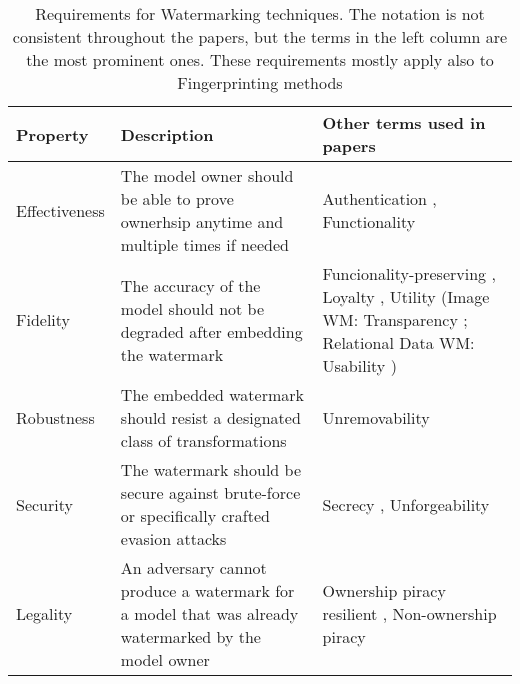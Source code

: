 \begin{table*}[t]
\centering
\caption{Requirements for Watermarking techniques. The notation is not consistent throughout the papers, but the terms in the left column are the most prominent ones. These requirements mostly apply also to Fingerprinting methods}


\begin{tabular}{|p{}|p{}|p{}|}
\rowcolor{gray!15}
\hline
\textbf{Property}               & \textbf{Description}                                                                                              & \textbf{Other terms used in papers}                        \\ \hline
%
Effectiveness                   & The model owner should be able to prove ownerhsip anytime and multiple times if needed                            & Authentication \cite{li_piracy_2020}, Functionality \cite{li_how_2019}                              \\ \hline
%
Fidelity                        & The accuracy of the model should not be degraded after embedding the watermark                                    & Funcionality-preserving \cite{li_piracy_2020, wang_robust_2020, adi_turning_2018}, Loyalty \cite{merrer_adversarial_2019}, Utility \cite{szyller_dawn_2020}
\scriptsize{(Image WM: Transparency \cite{potdar_survey_2005}; Relational Data WM: Usability \cite{kamran_comprehensive_2018})}                \\ \hline
%
Robustness                      & The embedded watermark should resist a designated class of transformations                                        & Unremovability \cite{adi_turning_2018, szyller_dawn_2020}                                            \\ \hline
%
Security                        & The watermark should be secure against brute-force or specifically crafted evasion attacks                        & Secrecy \cite{skripniuk_black-box_2020}, Unforgeability \cite{adi_turning_2018, wang_robust_2020}                                    \\ \hline
%
Legality                        & An adversary cannot produce a watermark for a model that was already watermarked by the model owner               & Ownership piracy resilient \cite{adi_turning_2018, wang_robust_2020}, Non-ownership piracy \cite{szyller_dawn_2020}           \\ \hline

\end{tabular}
\end{table*}

